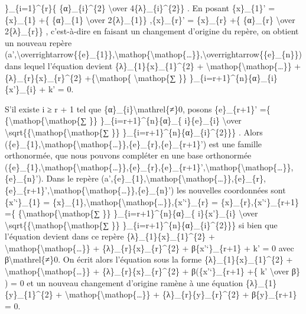 \documentclass[]{article}
\begin{document}
\}\_\{i=1\}\^{}\{r\}\{ \{α\}\_\{i\}\^{}\{2\} \textbackslash{}over
4\{λ\}\_\{i\}\^{}\{2\}\} . En posant \{x\}\_\{1\}' = \{x\}\_\{1\} +\{
\{α\}\_\{1\} \textbackslash{}over 2\{λ\}\_\{1\}\} ,\{x\}\_\{r\}' =
\{x\}\_\{r\} +\{ \{α\}\_\{r\} \textbackslash{}over 2\{λ\}\_\{r\}\} ,
c'est-à-dire en faisant un changement d'origine du repère, on obtient un
nouveau repère
(a',\textbackslash{}overrightarrow\{\{e\}\_\{1\}\},\textbackslash{}mathop\{\textbackslash{}mathop\{\ldots{}\}\},\textbackslash{}overrightarrow\{\{e\}\_\{n\}\})
dans lequel l'équation devient \{λ\}\_\{1\}\{x\}\_\{1\}\^{}\{2\} +
\textbackslash{}mathop\{\textbackslash{}mathop\{\ldots{}\}\} +
\{λ\}\_\{r\}\{x\}\_\{r\}\^{}\{2\} +\{\textbackslash{}mathop\{
\textbackslash{}mathop\{∑ \}\}
\}\_\{i=r+1\}\^{}\{n\}\{α\}\_\{i\}\{x'\}\_\{i\} + k' = 0.

S'il existe i ≥ r + 1 tel que \{α\}\_\{i\}\textbackslash{}mathrel\{≠\}0,
posons \{e\}\_\{r+1\}' =\{
\{\textbackslash{}mathop\{\textbackslash{}mathop\{∑ \}\}
\}\_\{i=r+1\}\^{}\{n\}\{α\}\_\{ i\}\{e\}\_\{i\} \textbackslash{}over
\textbackslash{}sqrt\{\{\textbackslash{}mathop\{\textbackslash{}mathop\{∑
\}\} \}\_\{i=r+1\}\^{}\{n\}\{α\}\_\{i\}\^{}\{2\}\}\} . Alors
(\{e\}\_\{1\},\textbackslash{}mathop\{\textbackslash{}mathop\{\ldots{}\}\},\{e\}\_\{r\},\{e\}\_\{r+1\}')
est une famille orthonormée, que nous pouvons compléter en une base
orthonormée
(\{e\}\_\{1\},\textbackslash{}mathop\{\textbackslash{}mathop\{\ldots{}\}\},\{e\}\_\{r\},\{e\}\_\{r+1\}',\textbackslash{}mathop\{\textbackslash{}mathop\{\ldots{}\}\},\{e\}\_\{n\}').
Dans le repère
(a',\{e\}\_\{1\},\textbackslash{}mathop\{\textbackslash{}mathop\{\ldots{}\}\},\{e\}\_\{r\},\{e\}\_\{r+1\}',\textbackslash{}mathop\{\textbackslash{}mathop\{\ldots{}\}\},\{e\}\_\{n\}')
les nouvelles coordonnées sont \{x'`\}\_\{1\} =
\{x\}\_\{1\},\textbackslash{}mathop\{\textbackslash{}mathop\{\ldots{}\}\},\{x'`\}\_\{r\}
= \{x\}\_\{r\},\{x'`\}\_\{r+1\} =\{
\{\textbackslash{}mathop\{\textbackslash{}mathop\{∑ \}\}
\}\_\{i=r+1\}\^{}\{n\}\{α\}\_\{ i\}\{x'\}\_\{i\} \textbackslash{}over
\textbackslash{}sqrt\{\{\textbackslash{}mathop\{\textbackslash{}mathop\{∑
\}\} \}\_\{i=r+1\}\^{}\{n\}\{α\}\_\{i\}\^{}\{2\}\}\} si bien que
l'équation devient dans ce repère \{λ\}\_\{1\}\{x\}\_\{1\}\^{}\{2\} +
\textbackslash{}mathop\{\textbackslash{}mathop\{\ldots{}\}\} +
\{λ\}\_\{r\}\{x\}\_\{r\}\^{}\{2\} + β\{x'`\}\_\{r+1\} + k' = 0 avec
β\textbackslash{}mathrel\{≠\}0. On écrit alors l'équation sous la forme
\{λ\}\_\{1\}\{x\}\_\{1\}\^{}\{2\} +
\textbackslash{}mathop\{\textbackslash{}mathop\{\ldots{}\}\} +
\{λ\}\_\{r\}\{x\}\_\{r\}\^{}\{2\} + β(\{x'`\}\_\{r+1\} +\{ k'
\textbackslash{}over β\} ) = 0 et un nouveau changement d'origine ramène
à une équation \{λ\}\_\{1\}\{y\}\_\{1\}\^{}\{2\} +
\textbackslash{}mathop\{\textbackslash{}mathop\{\ldots{}\}\} +
\{λ\}\_\{r\}\{y\}\_\{r\}\^{}\{2\} + β\{y\}\_\{r+1\} = 0.
\end{document}
